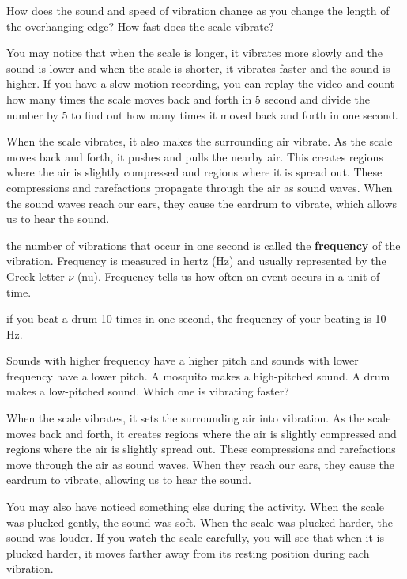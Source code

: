 \documentclass[12pt,a4paper]{tufte-handout}
\newcommand{\hertz}{Hz}
\begin{document}
 How does the sound and speed of vibration change as you change the length of the overhanging edge? How fast does the scale vibrate? 

You may notice that when the scale is longer, it vibrates more slowly and the sound is lower and when the scale is shorter, it vibrates faster and the sound is higher. If you have a slow motion recording, you can replay the video and count how many times the scale moves back and forth in 5 second and divide the number by 5 to find out how many times it moved back and forth in one second.

When the scale vibrates, it also makes the surrounding air vibrate. As the scale moves back and forth, it pushes and pulls the nearby air. This creates regions where the air is slightly compressed and regions where it is spread out. These compressions and rarefactions propagate through the air as sound waves. When the sound waves reach our ears, they cause the eardrum to vibrate, which allows us to hear the sound.

 the number of vibrations that occur in one second is called the \textbf{frequency} of the vibration. Frequency is measured in hertz (\hertz) and usually represented by the Greek letter $\nu$ (nu). Frequency tells us how often an event occurs in a unit of time. 

 if you beat a drum 10 times in one second, the frequency of your beating is 10 \hertz.

Sounds with higher frequency have a higher pitch and sounds with lower frequency have a lower pitch. A mosquito makes a high-pitched sound. A drum makes a low-pitched sound. Which one is vibrating faster?

When the scale vibrates, it sets the surrounding air into vibration. As the scale moves back and forth, it creates regions where the air is slightly compressed and regions where the air is slightly spread out. These compressions and rarefactions move through the air as sound waves. When they reach our ears, they cause the eardrum to vibrate, allowing us to hear the sound.


You may also have noticed something else during the activity. When the scale was plucked gently, the sound was soft. When the scale was plucked harder, the sound was louder. If you watch the scale carefully, you will see that when it is plucked harder, it moves farther away from its resting position during each vibration. 
\end{document}
